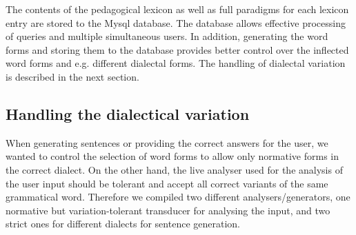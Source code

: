 \documentclass[11pt]{article}
\begin{document}
The contents of the pedagogical lexicon as well as full paradigms for each lexicon entry are stored to the Mysql database. The database allows effective processing of queries and multiple simultaneous users. In addition, generating the word forms and storing them to the database provides better control over the inflected word forms and e.g. different dialectal forms. The handling of dialectal variation is described in the next section.





\subsection{Handling the dialectical variation}\label{dialect}


When generating sentences or providing the correct answers for the user, we wanted to control the selection of word forms to allow only normative forms in the correct dialect. On the other hand, the live analyser used for the analysis of the user input should be tolerant  and accept all correct variants of the same grammatical word. Therefore we compiled two different analysers/generators, one normative but variation-tolerant transducer for analysing the input, and two strict ones for different dialects for sentence generation.
\end{document}
